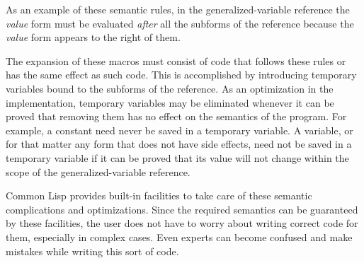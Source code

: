 As an example of these semantic rules, in the generalized-variable
reference  the \emph{value} form
must be evaluated \emph{after} all the subforms of the reference because
the \emph{value} form appears to the right of them.

The expansion of these macros must consist of code that follows these
rules or has the same effect as such code.  This is accomplished by
introducing temporary variables bound to the subforms of the reference.
As an optimization in the implementation,
temporary variables may be eliminated whenever it
can be proved that removing them has no effect on the semantics of the program.
For example, a constant need never be saved in a temporary variable.
A variable, or for that matter any form that does not have side effects, need not be
saved in a temporary variable if it can be proved that its value will
not change within the scope of the generalized-variable reference.

Common Lisp provides built-in facilities to take care of
these semantic complications and optimizations.  Since the required
semantics can be guaranteed by these facilities, the user does not
have to worry about writing correct code for them, especially in
complex cases.  Even experts can become confused and make mistakes
while writing this sort of code.

